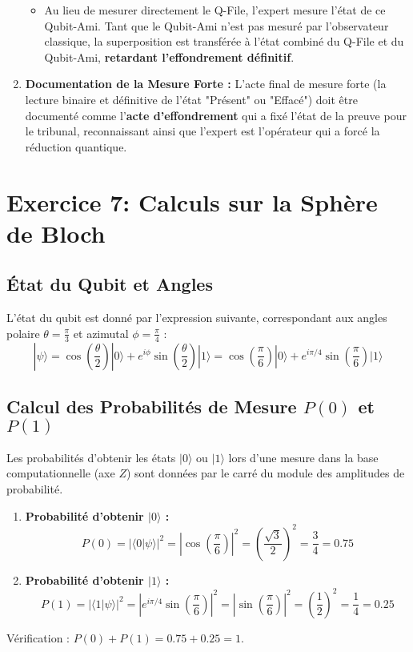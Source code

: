 \documentclass[12pt,a4paper]{report}
\begin{document}
\begin{enumerate}
\begin{itemize}
		\item Au lieu de mesurer directement le Q-File, l'expert mesure l'état de ce Qubit-Ami. Tant que le Qubit-Ami n'est pas mesuré par l'observateur classique, la superposition est transférée à l'état combiné du Q-File et du Qubit-Ami, \textbf{retardant l'effondrement définitif}.
	\end{itemize}
	\item \textbf{Documentation de la Mesure Forte :} L'acte final de mesure forte (la lecture binaire et définitive de l'état "Présent" ou "Effacé") doit être documenté comme l'\textbf{acte d'effondrement} qui a fixé l'état de la preuve pour le tribunal, reconnaissant ainsi que l'expert est l'opérateur qui a forcé la réduction quantique.
\end{enumerate}

\section*{Exercice 7: Calculs sur la Sphère de Bloch}

\subsection*{État du Qubit et Angles}

L'état du qubit est donné par l'expression suivante, correspondant aux angles polaire $\theta = \frac{\pi}{3}$ et azimutal $\phi = \frac{\pi}{4}$ :
$$|\psi\rangle = \cos\left(\frac{\theta}{2}\right)|0\rangle + e^{i\phi}\sin\left(\frac{\theta}{2}\right)|1\rangle = \cos\left(\frac{\pi}{6}\right)|0\rangle + e^{i\pi/4}\sin\left(\frac{\pi}{6}\right)|1\rangle$$

\subsection*{Calcul des Probabilités de Mesure $P(0)$ et $P(1)$}

Les probabilités d'obtenir les états $|0\rangle$ ou $|1\rangle$ lors d'une mesure dans la base computationnelle (axe $Z$) sont données par le carré du module des amplitudes de probabilité.

\begin{enumerate}
	\item \textbf{Probabilité d'obtenir $|0\rangle$ :}
	$$P(0) = |\langle 0 | \psi \rangle|^2 = \left|\cos\left(\frac{\pi}{6}\right)\right|^2 = \left(\frac{\sqrt{3}}{2}\right)^2 = \frac{3}{4} = 0.75$$
	
	\item \textbf{Probabilité d'obtenir $|1\rangle$ :}
	$$P(1) = |\langle 1 | \psi \rangle|^2 = \left|e^{i\pi/4}\sin\left(\frac{\pi}{6}\right)\right|^2 = \left|\sin\left(\frac{\pi}{6}\right)\right|^2 = \left(\frac{1}{2}\right)^2 = \frac{1}{4} = 0.25$$
\end{enumerate}
Vérification : $P(0) + P(1) = 0.75 + 0.25 = 1$.
\end{document}
